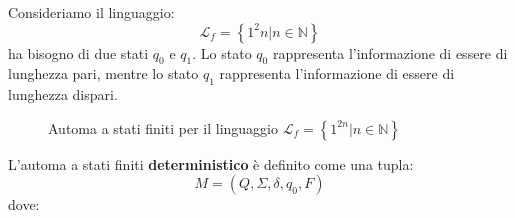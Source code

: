 \documentclass[a4paper]{article}
\begin{document}
\vspace{1em}
\noindent
Consideriamo il linguaggio:
\[
  \mathcal{L}_f = \left\{ 1^2n \left| n \in \mathbb{N} \right. \right\}
\] 
ha bisogno di due stati \( q_0 \) e \( q_1 \). Lo stato \( q_0 \) rappresenta
l'informazione di essere di lunghezza pari, mentre lo stato \( q_1 \)
rappresenta l'informazione di essere di lunghezza dispari.
\begin{figure}[H]
  \centering
  \caption{Automa a stati finiti per il linguaggio \( \mathcal{L}_f = \left\{ 1^{2n} \left| n
            \in \mathbb{N} \right. \right\} \)}
\end{figure}
L'automa a stati finiti \textbf{deterministico} è definito come una tupla:
\[
  M = \left( Q, \Sigma , \delta, q_0, F \right) 
\] 
dove:
\end{document}

